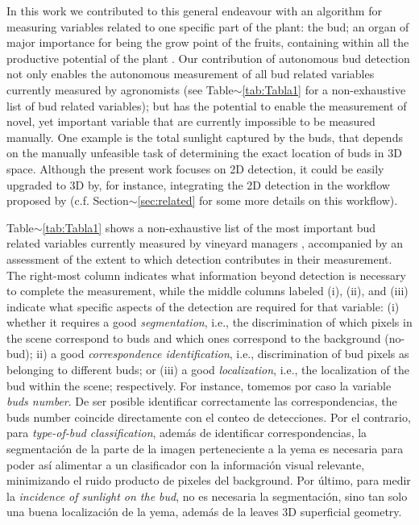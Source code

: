 \documentclass[a4paper,authoryear,review]{elsarticle}
\begin{document}
	In this work we contributed to this general endeavour with an algorithm for measuring variables related to one specific part of the plant: the bud; an organ of major importance for being the grow point of the fruits, containing within all the productive potential of the plant \citep{may2000bud}. Our contribution of  autonomous bud detection not only enables the autonomous measurement of all bud related variables currently measured by agronomists (see Table$\sim$\ref{tab:Tabla1} for a non-exhaustive list of bud related variables); but has the potential to enable the measurement of novel, yet important variable  that are currently impossible to be measured manually. One example is the total sunlight captured by the buds, that depends on the manually unfeasible task of determining the exact location of buds in 3D space.  Although the present work focuses on 2D detection, it could be easily upgraded to 3D by, for instance, integrating the 2D detection in the workflow proposed by \cite{diaz2018grapevine} (c.f. Section$\sim$\ref{sec:related} for some more details on this workflow).
	
	Table$\sim$\ref{tab:Tabla1} shows a non-exhaustive list of the most important bud related variables currently measured by vineyard managers \citep{sanchez2005bud, noyce2016basis, collins2020effects}, accompanied by an assessment of the extent to which detection contributes in their measurement. The right-most column indicates what information beyond detection  is necessary to complete the measurement, while the middle columns labeled (i), (ii), and (iii) indicate what specific aspects of the detection are required for that variable: (i) whether it requires a good  \emph{segmentation}, i.e., the discrimination of which pixels in the scene correspond to buds and which ones correspond to the background (no-bud); ii) a good \emph{correspondence identification}, i.e., discrimination of bud pixels as belonging to different buds; or (iii) a good \emph{localization}, i.e., the localization of the bud within the scene; respectively.
	For instance, tomemos por caso la variable \emph{buds number}. De ser posible identificar correctamente las correspondencias, the buds number coincide directamente con el conteo de detecciones. Por el contrario, para \emph{type-of-bud classification}, además de identificar correspondencias, la segmentación de la parte de la imagen perteneciente a la yema es necesaria para poder así alimentar a un clasificador con la información visual relevante, minimizando el ruido producto de pixeles del background. Por último, para medir la \emph{incidence of sunlight on the bud}, no es necesaria la segmentación, sino tan solo una buena localización de la yema, además de la leaves 3D superficial geometry.
	
\end{document}
